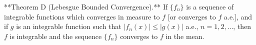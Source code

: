 **Theorem D (Lebesgue Bounded Convergence).** If $\{f_n\}$ is a sequence of integrable functions which converges in measure to $f$ [or converges to $f$ a.e.], and if $g$ is an integrable function such that $|f_n(x)| \leq |g(x)|$ a.e., $n=1,2,\dots$, then $f$ is integrable and the sequence $\{f_n\}$ converges to $f$ in the mean.
